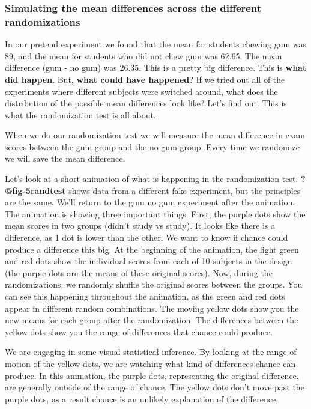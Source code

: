 \documentclass[
  letterpaper,
  DIV=11,
  numbers=noendperiod]{scrreprt}
\begin{document}
\subsubsection{Simulating the mean differences across the different
randomizations}\label{simulating-the-mean-differences-across-the-different-randomizations}

In our pretend experiment we found that the mean for students chewing
gum was 89, and the mean for students who did not chew gum was 62.65.
The mean difference (gum - no gum) was 26.35. This is a pretty big
difference. This is \textbf{what did happen}. But, \textbf{what could
have happened}? If we tried out all of the experiments where different
subjects were switched around, what does the distribution of the
possible mean differences look like? Let's find out. This is what the
randomization test is all about.

When we do our randomization test we will measure the mean difference in
exam scores between the gum group and the no gum group. Every time we
randomize we will save the mean difference.

Let's look at a short animation of what is happening in the
randomization test. \textbf{?@fig-5randtest} shows data from a different
fake experiment, but the principles are the same. We'll return to the
gum no gum experiment after the animation. The animation is showing
three important things. First, the purple dots show the mean scores in
two groups (didn't study vs study). It looks like there is a difference,
as 1 dot is lower than the other. We want to know if chance could
produce a difference this big. At the beginning of the animation, the
light green and red dots show the individual scores from each of 10
subjects in the design (the purple dots are the means of these original
scores). Now, during the randomizations, we randomly shuffle the
original scores between the groups. You can see this happening
throughout the animation, as the green and red dots appear in different
random combinations. The moving yellow dots show you the new means for
each group after the randomization. The differences between the yellow
dots show you the range of differences that chance could produce.

We are engaging in some visual statistical inference. By looking at the
range of motion of the yellow dots, we are watching what kind of
differences chance can produce. In this animation, the purple dots,
representing the original difference, are generally outside of the range
of chance. The yellow dots don't move past the purple dots, as a result
chance is an unlikely explanation of the difference.
\end{document}
